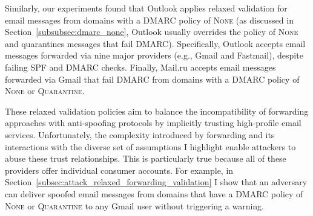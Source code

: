 Similarly, our experiments found that Outlook applies relaxed validation for email messages from domains with a DMARC policy of \textsc{None}
(as discussed in Section~\ref{subsubsec:dmarc_none}, Outlook usually overrides the policy of \textsc{None} and quarantines messages that fail DMARC).
Specifically, Outlook accepts email messages forwarded via nine major providers (e.g., Gmail and Fastmail),
despite failing SPF and DMARC checks.
Finally, Mail.ru accepts email messages forwarded via Gmail that fail DMARC from domains with a DMARC policy of \textsc{None} or \textsc{Quarantine}.


These relaxed validation policies aim to balance the incompatibility of forwarding approaches with anti-spoofing protocols by implicitly trusting high-profile email services.
Unfortunately, the complexity introduced by forwarding and its interactions with the diverse set of assumptions I highlight enable attackers to abuse these trust relationships.  This is particularly true because all of these providers offer individual consumer accounts.
For example, in Section~\ref{subsec:attack_relaxed_forwarding_validation} I show that an adversary can deliver spoofed email messages from domains that have a DMARC policy of \textsc{None} or \textsc{Quarantine} to any Gmail user without triggering a warning.

